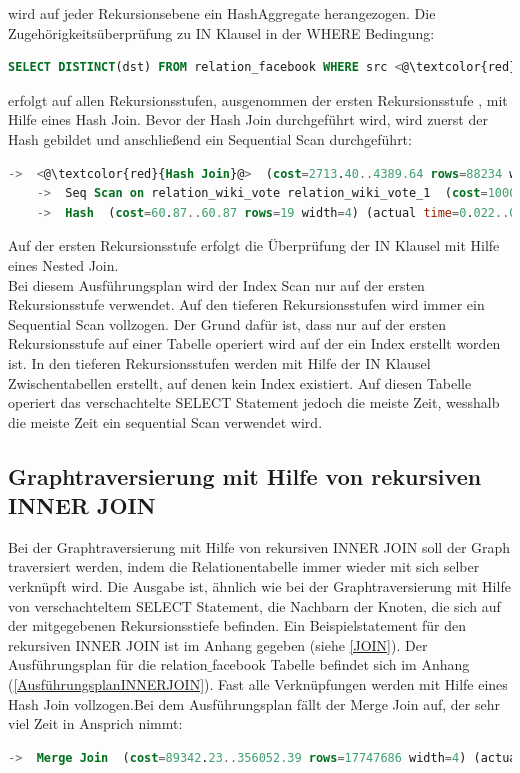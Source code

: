 wird auf jeder Rekursionsebene ein HashAggregate herangezogen. Die Zugehörigkeitsüberprüfung zu IN Klausel in der WHERE Bedingung:
\begin{lstlisting}[language=SQL,caption = IN Klausel,frame=single, label={INKlauselFacebook} ]
    SELECT DISTINCT(dst) FROM relation_facebook WHERE src <@\textcolor{red}{IN}@> ()
\end{lstlisting}
erfolgt auf allen Rekursionsstufen, ausgenommen der ersten Rekursionsstufe , mit Hilfe eines Hash Join. Bevor der Hash Join
durchgeführt wird, wird zuerst der Hash gebildet und anschließend ein Sequential Scan durchgeführt:
\begin{lstlisting}[language=SQL,caption = Aufruf der DISTINCT Funktion,frame=single, label={WhereConditionCTE} ]
    ->  <@\textcolor{red}{Hash Join}@>  (cost=2713.40..4389.64 rows=88234 width=4) (actual time=11.821..17.797 rows=1709 loops=1)
    ->  Seq Scan on relation_wiki_vote relation_wiki_vote_1  (cost=10000000000.00..10000001649.62 rows=100762 width=8) (actual time=0.004..4.822 rows=100762 loops=1)
    ->  Hash  (cost=60.87..60.87 rows=19 width=4) (actual time=0.022..0.022 rows=4 loops=1)
\end{lstlisting}
 Auf der ersten Rekursionsstufe erfolgt die Überprüfung der IN Klausel mit Hilfe eines Nested Join. \\ Bei diesem Ausführungsplan wird der Index Scan nur auf der ersten
Rekursionsstufe verwendet. Auf den tieferen Rekursionsstufen wird immer ein Sequential Scan vollzogen. Der Grund dafür ist, dass nur auf der ersten Rekursionsstufe auf
einer Tabelle operiert wird auf der ein Index erstellt worden ist. In den tieferen Rekursionsstufen werden mit Hilfe der IN Klausel Zwischentabellen erstellt, auf denen kein Index existiert.
 Auf diesen Tabelle operiert das verschachtelte SELECT Statement jedoch die meiste Zeit, wesshalb die meiste Zeit ein sequential Scan verwendet wird.
\subsection{Graphtraversierung mit Hilfe von rekursiven INNER JOIN}
\label{postgresInnerJoin}
Bei der Graphtraversierung mit Hilfe von rekursiven INNER JOIN soll der Graph traversiert werden, indem die Relationentabelle immer wieder mit sich selber verknüpft wird.
Die Ausgabe ist, ähnlich wie bei der Graphtraversierung mit Hilfe von verschachteltem SELECT Statement, die Nachbarn der Knoten, die sich auf der mitgegebenen Rekursionsstiefe
befinden. Ein Beispielstatement für den rekursiven INNER JOIN ist im Anhang gegeben (siehe \ref{JOIN}). Der Ausführungsplan für die relation$\_$facebook Tabelle befindet sich
im Anhang (\ref{AusführungsplanINNERJOIN}). Fast alle Verknüpfungen werden mit Hilfe eines Hash Join vollzogen.Bei dem Ausführungsplan fällt der Merge Join auf, der sehr viel Zeit in Ansprich nimmt:
\begin{lstlisting}[language=SQL,caption = Merge JOIN,frame=single, label={mergeJoin} ]
    ->  Merge Join  (cost=89342.23..356052.39 rows=17747686 width=4) (actual time=112.509..1178.121 rows=8863706 loops=1)
\end{lstlisting}

